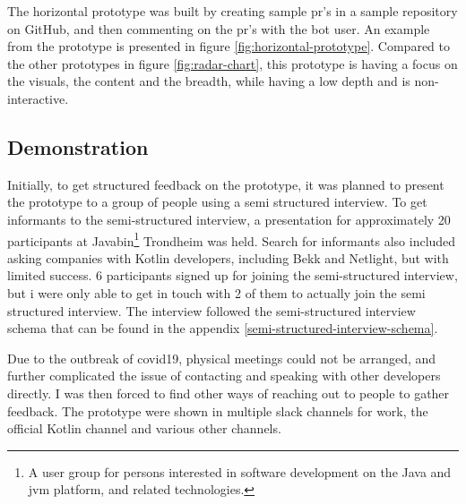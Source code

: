 \documentclass{report}
\begin{document}
The horizontal prototype was built by creating sample \gls{pr}'s in a sample repository on GitHub\cite{sample-repository}, and then commenting on the \gls{pr}'s with the bot user. An example from the prototype is presented in figure \ref{fig:horizontal-prototype}. Compared to the other prototypes in figure \ref{fig:radar-chart}, this prototype is having a focus on the visuals, the content and the breadth, while having a low depth and is non-interactive.

\subsection*{Demonstration}
Initially, to get structured feedback on the prototype, it was planned to present the prototype to a group of people using a semi structured interview. To get informants to the semi-structured interview, a presentation for approximately 20 participants at Javabin\footnote{A user group for persons interested in software development on the Java and \gls{jvm} platform, and related technologies.} Trondheim was held. Search for informants also included asking companies with Kotlin developers, including Bekk and Netlight, but with limited success. 6 participants signed up for joining the semi-structured interview, but i were only able to get in touch with 2 of them to actually join the semi structured interview. The interview followed the semi-structured interview schema that can be found in the appendix \ref{semi-structured-interview-schema}.

Due to the outbreak of \gls{covid19}, physical meetings could not be arranged, and further complicated the issue of contacting and speaking with other developers directly. I was then forced to find other ways of reaching out to people to gather feedback. The prototype were shown in multiple slack channels for work, the official Kotlin channel and various other channels.
\end{document}
